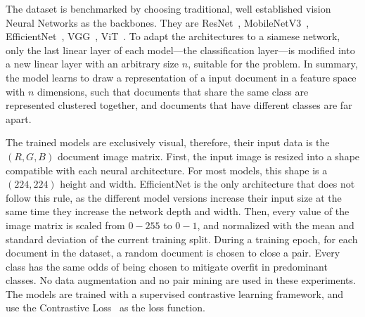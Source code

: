 The dataset is benchmarked by choosing traditional, well established vision Neural Networks as the backbones. They are ResNet~\cite{he_deep_2016}, MobileNetV3~\cite{howard_searching_2019}, EfficientNet~\cite{tan_efficientnet_2019}, VGG~\cite{simonyan_very_2015}, \gls{ViT}~\cite{dosovitskiy_image_2021}. To adapt the architectures to a siamese network, only the last linear layer of each model---the classification layer---is modified into a new linear layer with an arbitrary size $n$, suitable for the problem. In summary, the model learns to draw a representation of a input document in a feature space with $n$ dimensions, such that documents that share the same class are represented clustered together, and documents that have different classes are far apart. 

The trained models are exclusively visual, therefore, their input data is the $(R, G, B)$ document image matrix. First, the input image is resized into a shape compatible with each neural architecture. For most models, this shape is a $(224, 224)$ height and width. EfficientNet is the only architecture that does not follow this rule, as the different model versions increase their input size at the same time they increase the network depth and width. Then, every value of the image matrix is scaled from $0-255$ to $0-1$, and normalized with the mean and standard deviation of the current training split. During a training epoch, for each document in the dataset, a random document is chosen to close a pair. Every class has the same odds of being chosen to mitigate overfit in predominant classes. No data augmentation and no pair mining are used in these experiments. The models are trained with a supervised contrastive learning framework, and use the Contrastive Loss~\cite{chopra_learning_2005} as the loss function.